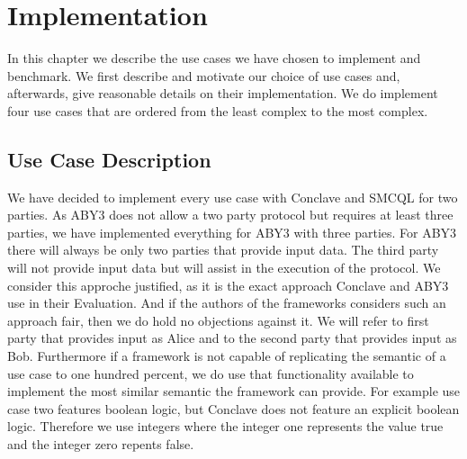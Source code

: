 \chapter{Implementation}
\label{Implementation}	
In this chapter we describe the use cases we have chosen to implement and benchmark. We first describe and motivate our choice of use cases and, afterwards, give reasonable details on their implementation. We do implement four use cases that are ordered from the least complex to the most complex.
\section{Use Case Description}
\label{Use Case}	 
We have decided to implement every use case with Conclave and SMCQL for two parties. As ABY3 does not allow a two party protocol but requires at least three parties, we have implemented everything for ABY3 with three parties. For ABY3 there will always be only two parties that provide input data. The third party will not provide input data but will assist in the execution of the protocol. We consider this approche justified, as it is the exact approach Conclave and ABY3 use in their Evaluation. And if the authors of the frameworks considers such an approach fair, then we do hold no objections against it.  
We will refer to first party that provides input as Alice and to the second party that provides input as Bob. Furthermore if a framework is not capable of replicating the semantic of a use case to one hundred percent, we do use that functionality available to implement the most similar semantic the framework can provide. For example use case two features boolean logic, but Conclave does not feature an explicit boolean logic. Therefore we use integers where the integer one represents the value true and the integer zero repents false.   

